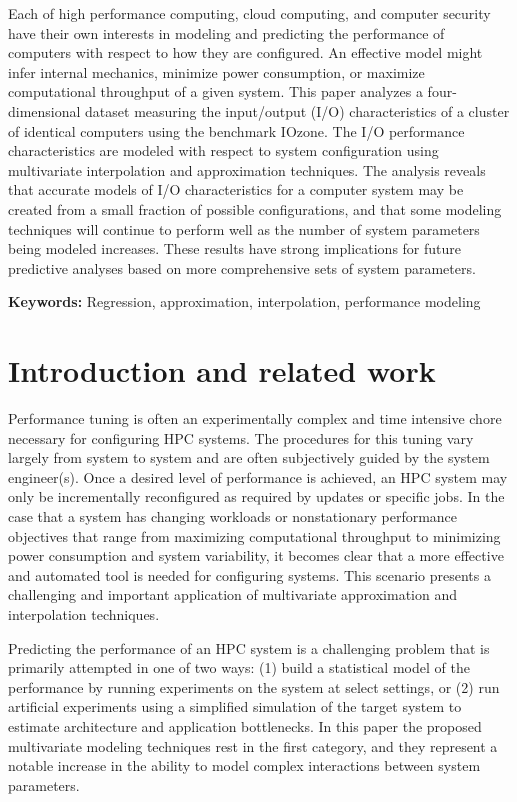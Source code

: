 \documentclass{scspaperproc}
\theoremstyle{scsthe}
\begin{document}
Each of high performance computing, cloud computing, and computer
security have their own interests in modeling and predicting the
performance of computers with respect to how they are configured. An
effective model might infer internal mechanics, minimize power
consumption, or maximize computational throughput of a given
system. This paper analyzes a four-dimensional dataset measuring the
input/output (I/O) characteristics of a cluster of identical computers
using the benchmark IOzone. The I/O performance characteristics are
modeled with respect to system configuration using multivariate
interpolation and approximation techniques. The analysis reveals that
accurate models of I/O characteristics for a computer system may be
created from a small fraction of possible configurations, and that
some modeling techniques will continue to perform well as the number
of system parameters being modeled increases. These results have
strong implications for future predictive analyses based on more
comprehensive sets of system parameters.

\textbf{Keywords:} Regression, approximation, interpolation,
performance modeling


\section{Introduction and related work}
\label{sec:introduction}

Performance tuning is often an experimentally complex and time
intensive chore necessary for configuring HPC systems. The procedures
for this tuning vary largely from system to system and are often
subjectively guided by the system engineer(s). Once a desired level of
performance is achieved, an HPC system may only be incrementally
reconfigured as required by updates or specific jobs. In the case that
a system has changing workloads or nonstationary performance
objectives that range from maximizing computational throughput to
minimizing power consumption and system variability, it becomes clear
that a more effective and automated tool is needed for configuring
systems. This scenario presents a challenging and important
application of multivariate approximation and interpolation
techniques.

Predicting the performance of an HPC system is a challenging problem
that is primarily attempted in one of two ways: (1) build a
statistical model of the performance by running experiments on the
system at select settings, or (2) run artificial experiments using a
simplified simulation of the target system to estimate architecture
and application bottlenecks. In this paper the proposed multivariate
modeling techniques rest in the first category, and they represent a
notable increase in the ability to model complex interactions between
system parameters.
\end{document}
